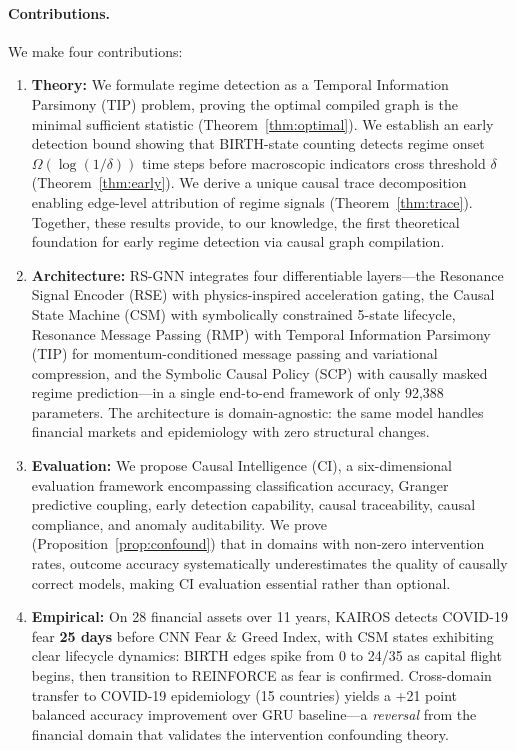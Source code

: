 \documentclass[11pt]{article}
\begin{document}
\paragraph{Contributions.} We make four contributions:
\begin{enumerate}
    \item \textbf{Theory:} We formulate regime detection as a Temporal Information Parsimony (TIP) problem, proving the optimal compiled graph is the minimal sufficient statistic (Theorem~\ref{thm:optimal}). We establish an early detection bound showing that BIRTH-state counting detects regime onset $\Omega(\log(1/\delta))$ time steps before macroscopic indicators cross threshold $\delta$ (Theorem~\ref{thm:early}). We derive a unique causal trace decomposition enabling edge-level attribution of regime signals (Theorem~\ref{thm:trace}). Together, these results provide, to our knowledge, the first theoretical foundation for early regime detection via causal graph compilation.
    \item \textbf{Architecture:} RS-GNN integrates four differentiable layers---the Resonance Signal Encoder (RSE) with physics-inspired acceleration gating, the Causal State Machine (CSM) with symbolically constrained 5-state lifecycle, Resonance Message Passing (RMP) with Temporal Information Parsimony (TIP) for momentum-conditioned message passing and variational compression, and the Symbolic Causal Policy (SCP) with causally masked regime prediction---in a single end-to-end framework of only 92,388 parameters. The architecture is domain-agnostic: the same model handles financial markets and epidemiology with zero structural changes.
    \item \textbf{Evaluation:} We propose Causal Intelligence (CI), a six-dimensional evaluation framework encompassing classification accuracy, Granger predictive coupling, early detection capability, causal traceability, causal compliance, and anomaly auditability. We prove (Proposition~\ref{prop:confound}) that in domains with non-zero intervention rates, outcome accuracy systematically underestimates the quality of causally correct models, making CI evaluation essential rather than optional.
    \item \textbf{Empirical:} On 28 financial assets over 11 years, KAIROS detects COVID-19 fear \textbf{25 days} before CNN Fear \& Greed Index, with CSM states exhibiting clear lifecycle dynamics: BIRTH edges spike from 0 to 24/35 as capital flight begins, then transition to REINFORCE as fear is confirmed. Cross-domain transfer to COVID-19 epidemiology (15 countries) yields a +21 point balanced accuracy improvement over GRU baseline---a \emph{reversal} from the financial domain that validates the intervention confounding theory.
\end{enumerate}
\end{document}
